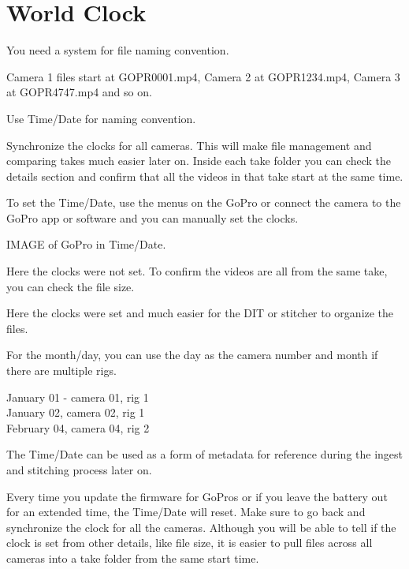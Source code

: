 \chapter{World Clock}
\pagecolor{white}
\label{chap:5}
\begin{fullwidth}


\problem

{\large You need a system for file naming convention. \par}

Camera 1 files start at GOPR0001.mp4, Camera 2 at GOPR1234.mp4, Camera 3 at GOPR4747.mp4 and so on. 


\solution

{\large Use Time/Date for naming convention. \par}

Synchronize the clocks for all cameras. This will make file management and comparing takes much easier later on. Inside each take folder you can check the details section and confirm that all the videos in that take start at the same time. 

To set the Time/Date, use the menus on the GoPro or connect the camera to the GoPro app or software and you can manually set the clocks.

IMAGE of GoPro in Time/Date.

Here the clocks were not set. To confirm the videos are all from the same take, you can check the file size. 


Here the clocks were set and much easier for the DIT or stitcher to organize the files.


For the month/day, you can use the day as the camera number and month if there are multiple rigs. 

January 01 - camera 01, rig 1
\\
January 02, camera 02, rig 1
\\
February 04, camera 04, rig 2


The Time/Date can be used as a form of metadata for reference during the ingest and stitching process later on. 

\tip Every time you update the firmware for GoPros or if you leave the battery out for an extended time, the Time/Date will reset. Make sure to go back and synchronize the clock for all the cameras. Although you will be able to tell if the clock is set from other details, like file size, it is easier to pull files across all cameras into a take folder from the same start time. 




\clearpage
\end{fullwidth}
